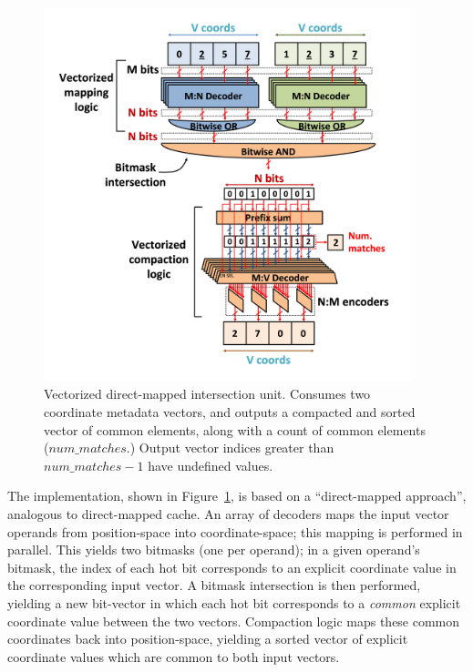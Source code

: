 \begin{figure}[H]
    \centering
    \includegraphics[width=0.95\textwidth]{figures/direct_mapped_isect.png}
    \caption{Vectorized direct-mapped intersection unit. Consumes two coordinate metadata vectors, and outputs a compacted and sorted vector of common elements, along with a count of common elements ($num\_matches$.) Output vector indices greater than $num\_matches - 1$ have undefined values.}
    \label{fig:direct_mapped_isect}
\end{figure}

\clearpage

The implementation, shown in Figure~\ref{fig:direct_mapped_isect}, is based on a ``direct-mapped approach'', analogous to direct-mapped cache. An array of decoders maps the input vector operands from position-space into coordinate-space; this mapping is performed in parallel. This yields two bitmasks (one per operand); in a given operand's bitmask, the index of each hot bit corresponds to an explicit coordinate value in the corresponding input vector. A bitmask intersection is then performed, yielding a new bit-vector in which each hot bit corresponds to a \textit{common} explicit coordinate value between the two vectors. Compaction logic maps these common coordinates back into position-space, yielding a sorted vector of explicit coordinate values which are common to both input vectors.

